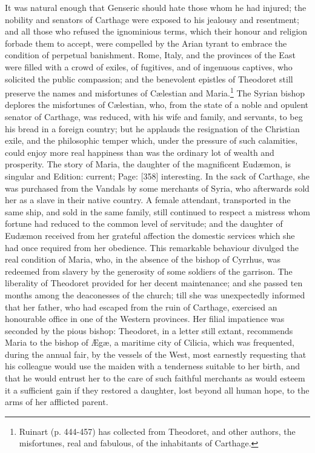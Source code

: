 It was natural enough that Genseric should hate those whom he had injured; the nobility and senators of Carthage were exposed to his jealousy and resentment; and all those who refused the ignominious terms, which their honour and religion forbade them to accept, were compelled by the Arian tyrant to embrace the condition of perpetual banishment. Rome, Italy, and the provinces of the East were filled with a crowd of exiles, of fugitives, and of ingenuous captives, who solicited the public compassion; and the benevolent epistles of Theodoret still preserve the names and misfortunes of Cælestian and Maria.\footnote{Ruinart (p. 444-457) has collected from Theodoret, and other authors, the misfortunes, real and fabulous, of the inhabitants of Carthage.} The Syrian bishop deplores the misfortunes of Cælestian, who, from the state of a noble and opulent senator of Carthage, was reduced, with his wife and family, and servants, to beg his bread in a foreign country; but he applauds the resignation of the Christian exile, and the philosophic temper which, under the pressure of such calamities, could enjoy more real happiness than was the ordinary lot of wealth and prosperity. The story of Maria, the daughter of the magnificent Eudæmon, is singular and Edition: current; Page: [358] interesting. In the sack of Carthage, she was purchased from the Vandals by some merchants of Syria, who afterwards sold her as a slave in their native country. A female attendant, transported in the same ship, and sold in the same family, still continued to respect a mistress whom fortune had reduced to the common level of servitude; and the daughter of Eudæmon received from her grateful affection the domestic services which she had once required from her obedience. This remarkable behaviour divulged the real condition of Maria, who, in the absence of the bishop of Cyrrhus, was redeemed from slavery by the generosity of some soldiers of the garrison. The liberality of Theodoret provided for her decent maintenance; and she passed ten months among the deaconesses of the church; till she was unexpectedly informed that her father, who had escaped from the ruin of Carthage, exercised an honourable office in one of the Western provinces. Her filial impatience was seconded by the pious bishop: Theodoret, in a letter still extant, recommends Maria to the bishop of Ægæ, a maritime city of Cilicia, which was frequented, during the annual fair, by the vessels of the West, most earnestly requesting that his colleague would use the maiden with a tenderness suitable to her birth, and that he would entrust her to the care of such faithful merchants as would esteem it a sufficient gain if they restored a daughter, lost beyond all human hope, to the arms of her afflicted parent.

